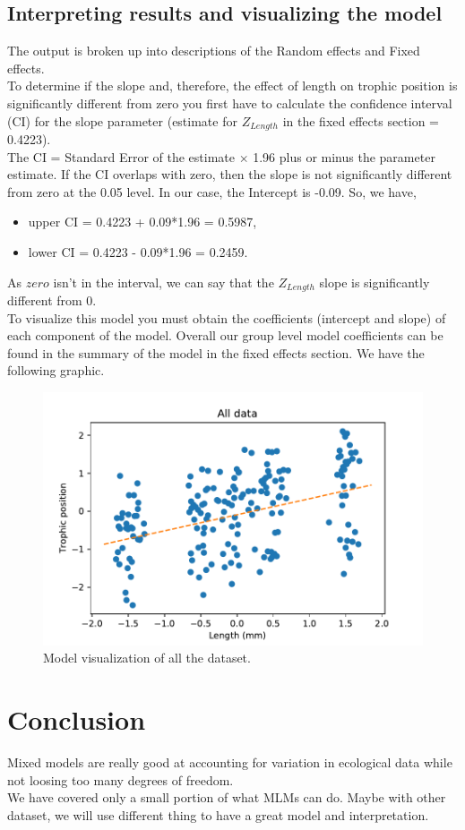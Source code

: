 \documentclass{article}
\begin{document}
\subsection{Interpreting results and visualizing the model}
The output is broken up into descriptions of the Random effects and Fixed effects. \\
To determine if the slope and, therefore, the effect of length on trophic position is significantly different from zero you first have to calculate the confidence interval (CI) for the slope parameter (estimate for $Z_{Length}$ in the fixed effects section = 0.4223).\\
The CI = Standard Error of the estimate $\times$ 1.96 plus or minus the parameter estimate. If the CI overlaps with zero, then the slope is not significantly different from zero at the 0.05 level. In our case, the Intercept is -0.09. So, we have, 
\begin{itemize}
    \item upper CI = 0.4223 + 0.09*1.96 = 0.5987,
    \item lower CI = 0.4223 - 0.09*1.96 = 0.2459.
\end{itemize}

As $zero$ isn't in the interval, we can say that the $Z_{Length}$ slope is significantly different from 0.\\
To visualize this model you must obtain the coefficients (intercept and slope) of each component of the model. Overall our group level model coefficients can be found in the summary of the model in the fixed effects section.
We have the following graphic. 
\begin{figure}[h!]
    \centering
    \includegraphics[scale=0.7]{images/Model_visual_all_data.pdf}
    \caption{Model visualization of all the dataset.}
    \label{all_data}
\end{figure}

\section{Conclusion}
Mixed models are really good at accounting for variation in ecological data while not loosing too many degrees of freedom.\\
We have covered only a small portion of what MLMs can do. Maybe with other dataset, we will use different thing to have a great model and interpretation.

\newpage

\nocite{*}

\end{document}
